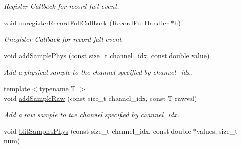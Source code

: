 \begin{DoxyCompactItemize}
\begin{DoxyCompactList}\small\item\em Register Callback for record full event. \item\end{DoxyCompactList}\item 
\hypertarget{classgdf_1_1_record_buffer_a818a3b72f625ef7b0dc8bf8a79336bdf}{
void \hyperlink{classgdf_1_1_record_buffer_a818a3b72f625ef7b0dc8bf8a79336bdf}{unregisterRecordFullCallback} (\hyperlink{classgdf_1_1_record_buffer_1_1_record_full_handler}{RecordFullHandler} $\ast$h)}
\label{classgdf_1_1_record_buffer_a818a3b72f625ef7b0dc8bf8a79336bdf}

\begin{DoxyCompactList}\small\item\em Unegister Callback for record full event. \item\end{DoxyCompactList}\item 
\hypertarget{classgdf_1_1_record_buffer_ac516aef638abed8539809c42b18fcc47}{
void \hyperlink{classgdf_1_1_record_buffer_ac516aef638abed8539809c42b18fcc47}{addSamplePhys} (const size\_\-t channel\_\-idx, const double value)}
\label{classgdf_1_1_record_buffer_ac516aef638abed8539809c42b18fcc47}

\begin{DoxyCompactList}\small\item\em Add a physical sample to the channel specified by channel\_\-idx. \item\end{DoxyCompactList}\item 
\hypertarget{classgdf_1_1_record_buffer_ac60eef93ea59ab0f159b57d23412ee0f}{
{\footnotesize template$<$typename T $>$ }\\void \hyperlink{classgdf_1_1_record_buffer_ac60eef93ea59ab0f159b57d23412ee0f}{addSampleRaw} (const size\_\-t channel\_\-idx, const T rawval)}
\label{classgdf_1_1_record_buffer_ac60eef93ea59ab0f159b57d23412ee0f}

\begin{DoxyCompactList}\small\item\em Add a raw sample to the channel specified by channel\_\-idx. \item\end{DoxyCompactList}\item 
\hypertarget{classgdf_1_1_record_buffer_ada2965511d8ec8aa18c19761284a8690}{
void \hyperlink{classgdf_1_1_record_buffer_ada2965511d8ec8aa18c19761284a8690}{blitSamplesPhys} (const size\_\-t channel\_\-idx, const double $\ast$values, size\_\-t num)}
\label{classgdf_1_1_record_buffer_ada2965511d8ec8aa18c19761284a8690}


\end{DoxyCompactItemize}
